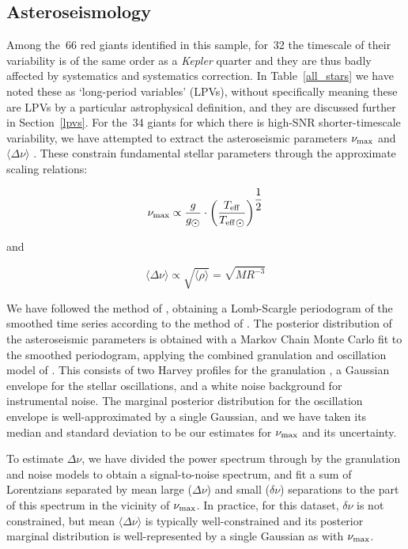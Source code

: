 \documentclass[a4paper,fleqn,usenatbib]{mnras}
\newcommand{\numax}{\mbox{$\nu_{\rm max}$}\xspace}
\newcommand{\Dnu}{\mbox{$\Delta \nu$}\xspace}
\newcommand{\dnu}{\mbox{$\delta \nu$}\xspace}
\newcommand{\teff}{\mbox{$T_{\rm eff}$}\xspace}
\newcommand{\kepler}{\emph{Kepler}\xspace}
\begin{document}



\subsection{Asteroseismology}
\label{asteroseismology}

Among the~66 red giants identified in this sample, for~32 the timescale of their variability is of the same order as a \kepler quarter and they are thus badly affected by systematics and systematics correction. In Table~\ref{all_stars} we have noted these as `long-period variables' (LPVs), without specifically meaning these are LPVs by a particular astrophysical definition, and they are discussed further in Section~\ref{lpvs}. For the~34 giants for which there is high-SNR shorter-timescale variability, we have attempted to extract the asteroseismic parameters \numax and $\langle \Dnu \rangle$ \citep{KB95,2013ARA&A..51..353C}. These constrain fundamental stellar parameters through the approximate scaling relations: 

\begin{equation}
\label{scaling}
\numax \propto \dfrac{g}{g_{\sun}} \cdot \left(\dfrac{\teff}{\teff_{\sun}}\right)^{\dfrac{1}{2}}
\end{equation}

and

\begin{equation}
\langle \Dnu \rangle \propto \sqrt{\langle \rho \rangle} = \sqrt{M {R}^{-3}}
\end{equation}

We have followed the method of \citet{2016AN....337..774D}, obtaining a Lomb-Scargle periodogram of the smoothed time series according to the method of \citet{2011MNRAS.414L...6G}. The posterior distribution of the asteroseismic parameters is obtained with a Markov Chain Monte Carlo fit to the smoothed periodogram, applying the combined granulation and oscillation model of \citet{2014A&A...570A..41K}. This consists of two Harvey profiles for the granulation \citep{1985ESASP.235..199H}, a Gaussian envelope for the stellar oscillations, and a white noise background for instrumental noise. The marginal posterior distribution for the oscillation envelope is well-approximated by a single Gaussian, and we have taken its median and standard deviation to be our estimates for \numax and its uncertainty.

To estimate \Dnu, we have divided the power spectrum through by the granulation and noise models to obtain a signal-to-noise spectrum, and fit a sum of Lorentzians separated by mean large (\Dnu) and small (\dnu) separations to the part of this spectrum in the vicinity of \numax. In practice, for this dataset, \dnu is not constrained, but mean $\langle \Dnu \rangle$ is typically well-constrained and its posterior marginal distribution is well-represented by a single Gaussian as with \numax. 
\end{document}
